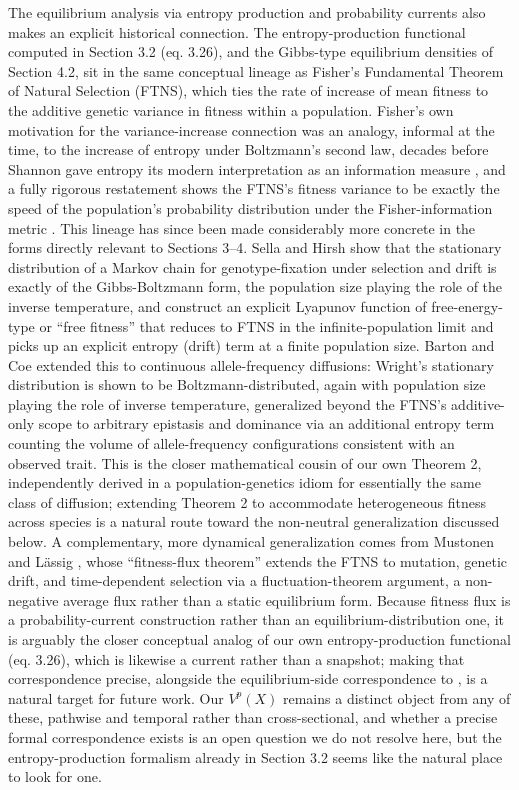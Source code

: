 \documentclass[12pt]{article}
\begin{document}
The equilibrium analysis via entropy production and probability currents also makes an explicit historical connection. The entropy-production functional computed in Section 3.2 (eq. 3.26), and the Gibbs-type equilibrium densities of Section 4.2, sit in the same conceptual lineage as Fisher's Fundamental Theorem of Natural Selection (FTNS), which ties the rate of increase of mean fitness to the additive genetic variance in fitness within a population. Fisher's own motivation for the variance-increase connection was an analogy, informal at the time, to the increase of entropy under Boltzmann's second law, decades before Shannon gave entropy its modern interpretation as an information measure \cite{smith2023beyond}, and a fully rigorous restatement shows the FTNS's fitness variance to be exactly the speed of the population's probability distribution under the Fisher-information metric \cite{baez2021fundamental}. This lineage has since been made considerably more concrete in the forms directly relevant to Sections 3–4. Sella and Hirsh \cite{sella2005application} show that the stationary distribution of a Markov chain for genotype-fixation under selection and drift is exactly of the Gibbs-Boltzmann form, the population size playing the role of the inverse temperature, and construct an explicit Lyapunov function of free-energy-type or ``free fitness” that reduces to FTNS in the infinite-population limit and picks up an explicit entropy (drift) term at a finite population size. Barton and Coe \cite{barton2009application} extended this to continuous allele-frequency diffusions: Wright's stationary distribution is shown to be Boltzmann-distributed, again with population size playing the role of inverse temperature, generalized beyond the FTNS's additive-only scope to arbitrary epistasis and dominance via an additional entropy term counting the volume of allele-frequency configurations consistent with an observed trait. This is the closer mathematical cousin of our own Theorem 2, independently derived in a population-genetics idiom for essentially the same class of diffusion; extending Theorem 2 to accommodate heterogeneous fitness across species is a natural route toward the non-neutral generalization discussed below. A complementary, more dynamical generalization comes from Mustonen and Lässig \cite{mustonen2010fitness}, whose “fitness-flux theorem” extends the FTNS to mutation, genetic drift, and time-dependent selection via a fluctuation-theorem argument, a non-negative average flux rather than a static equilibrium form. Because fitness flux is a probability-current construction rather than an equilibrium-distribution one, it is arguably the closer conceptual analog of our own entropy-production functional (eq. 3.26), which is likewise a current rather than a snapshot; making that correspondence precise, alongside the equilibrium-side correspondence to \cite{barton2009application, sella2005application}, is a natural target for future work. Our $V^p (X)$ remains a distinct object from any of these, pathwise and temporal rather than cross-sectional, and whether a precise formal correspondence exists is an open question we do not resolve here, but the entropy-production formalism already in Section 3.2 seems like the natural place to look for one.
\end{document}
